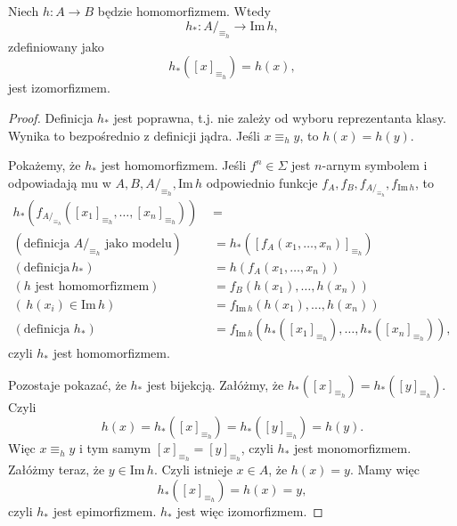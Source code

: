 \begin{theorem}\label{th:isomorphism}
	Niech $h: A \to B$ będzie homomorfizmem.
	Wtedy
	\begin{equation}
		h_*: A/_{\equiv_h} \to \mathrm{Im}\,h,
	\end{equation}
	zdefiniowany jako
	\begin{equation}
		h_*([x]_{\equiv_h}) = h(x),
	\end{equation}
	jest izomorfizmem.
\end{theorem}
\begin{proof}
	Definicja $h_*$ jest poprawna,
		t.j. nie zależy od wyboru reprezentanta klasy.
	Wynika to bezpośrednio z definicji jądra.
	Jeśli $x \equiv_h y$, to $h(x) = h(y)$.

	Pokażemy, że $h_*$ jest homomorfizmem.
	Jeśli $f^n \in \Sigma$ jest $n$-arnym symbolem
		i odpowiadają mu w $A, B, A/_{\equiv_h}, \mathrm{Im}\,h$
		odpowiednio funkcje $f_A, f_B, f_{A/_{\equiv_h}}, f_{\mathrm{Im}\,h}$,
		to
	\begin{align}
		h_*(f_{A/_{\equiv_h}}([x_1]_{\equiv_h}, \dots, [x_n]_{\equiv_h})) &= \\
			(\text{definicja $A/_{\equiv_h}$ jako modelu})\qquad &= h_*([f_A(x_1, \dots, x_n)]_{\equiv_h}) \\
			(\text{definicja}\,h_*)\qquad &= h(f_A(x_1, \dots, x_n)) \\
			(\text{$h$ jest homomorfizmem})\qquad &= f_B(h(x_1), \dots, h(x_n)) \\
			(\,h(x_i) \in \mathrm{Im}\,h)\qquad &= f_{\mathrm{Im}\,h}(h(x_1), \dots, h(x_n)) \\
			(\text{definicja $h_*$})\qquad &= f_{\mathrm{Im}\,h}(h_*([x_1]_{\equiv_h}), \dots, h_*([x_n]_{\equiv_h})),
	\end{align}
	czyli $h_*$ jest homomorfizmem.

	Pozostaje pokazać,
		że $h_*$ jest bijekcją.
	Załóżmy, że $h_*([x]_{\equiv_h}) = h_*([y]_{\equiv_h})$.
	Czyli
	\begin{equation}
		h(x) = h_*([x]_{\equiv_h}) = h_*([y]_{\equiv_h}) = h(y).
	\end{equation}
	Więc $x \equiv_h y$ i tym samym $[x]_{\equiv_h} = [y]_{\equiv_h}$, czyli
		$h_*$ jest monomorfizmem.
	Załóżmy teraz,
		że $y \in \mathrm{Im}\,h$.
	Czyli istnieje $x \in A$, że $h(x) = y$.
	Mamy więc
	\begin{equation}
		h_*([x]_{\equiv_h}) = h(x) = y,
	\end{equation}
	czyli $h_*$ jest epimorfizmem.
	$h_*$ jest więc izomorfizmem.
\end{proof}

